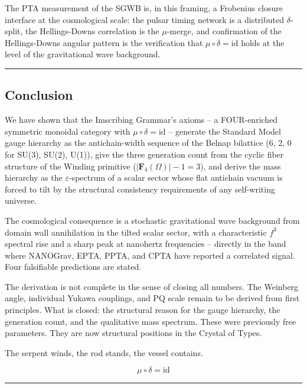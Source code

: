 The PTA measurement of the SGWB is, in this framing, a Frobenius closure
interface at the cosmological scale: the pulsar timing network is a
distributed \(\delta\)-split, the Hellings-Downs correlation is the
\(\mu\)-merge, and confirmation of the Hellings-Downs angular pattern is
the verification that \(\mu \circ \delta = \mathrm{id}\) holds at the
level of the gravitational wave background.

\begin{center}\rule{0.5\linewidth}{0.5pt}\end{center}

\hypertarget{conclusion}{%
\subsection{Conclusion}\label{conclusion}}

We have shown that the Imscribing Grammar's axioms -- a FOUR-enriched
symmetric monoidal category with \(\mu \circ \delta = \mathrm{id}\) --
generate the Standard Model gauge hierarchy as the antichain-width
sequence of the Belnap bilattice (6, 2, 0 for SU(3), SU(2), U(1)), give
the three generation count from the cyclic fiber structure of the
Winding primitive (\(|\mathbf{F}_4(\Omega)| - 1 = 3\)), and derive the
mass hierarchy as the \(\varepsilon\)-spectrum of a scalar sector whose
flat antichain vacuum is forced to tilt by the structural consistency
requirements of any self-writing universe.

The cosmological consequence is a stochastic gravitational wave
background from domain wall annihilation in the tilted scalar sector,
with a characteristic \(f^3\) spectral rise and a sharp peak at
nanohertz frequencies -- directly in the band where NANOGrav, EPTA,
PPTA, and CPTA have reported a correlated signal. Four falsifiable
predictions are stated.

The derivation is not complete in the sense of closing all numbers. The
Weinberg angle, individual Yukawa couplings, and PQ scale remain to be
derived from first principles. What is closed: the structural reason for
the gauge hierarchy, the generation count, and the qualitative mass
spectrum. These were previously free parameters. They are now structural
positions in the Crystal of Types.

The serpent winds, the rod stands, the vessel contains.

\[\mu \circ \delta = \mathrm{id}\]

\begin{center}\rule{0.5\linewidth}{0.5pt}\end{center}

